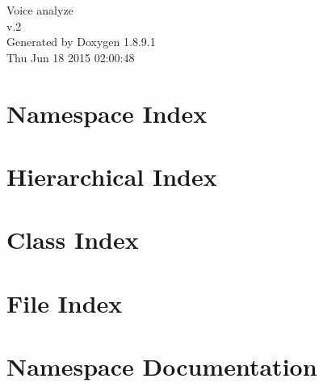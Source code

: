 \documentclass[twoside]{book}
\newcommand{\+}{\discretionary{\mbox{\scriptsize$\hookleftarrow$}}{}{}}
\newcommand{\clearemptydoublepage}{%
  \newpage{\pagestyle{empty}\cleardoublepage}%
}
\begin{document}
\begin{titlepage}
\vspace*{7cm}
\begin{center}%
{\Large Voice analyze \\[1ex]\large v.\+2 }\\
\vspace*{1cm}
{\large Generated by Doxygen 1.8.9.1}\\
\vspace*{0.5cm}
{\small Thu Jun 18 2015 02:00:48}\\
\end{center}
\end{titlepage}
\clearemptydoublepage
\tableofcontents
\clearemptydoublepage
{}

\chapter{Namespace Index}

\chapter{Hierarchical Index}

\chapter{Class Index}

\chapter{File Index}

\chapter{Namespace Documentation}

\end{document}
